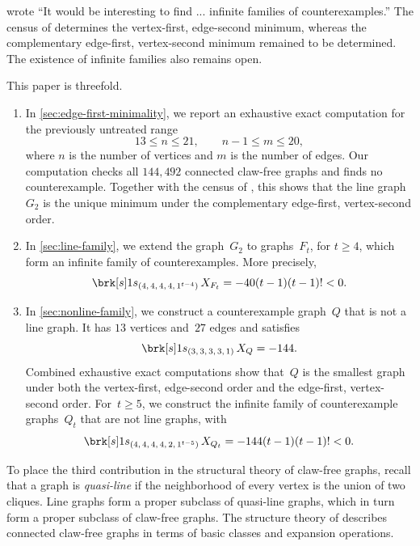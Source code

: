 \documentclass[11pt]{amsart}
\numberwithin{equation}{section}
\theoremstyle{remark}
\newcommand{\CSF}{X}
\newcommand{\Gtwo}{G_{2}}
\newcommand{\Ft}{F_t}
\newcommand{\Qt}{Q_t}
\newcommand{\coeff}[2]{\brk[s]1{s_{#1}}\,#2}
\begin{document}
 wrote
``It would be interesting to find ... infinite families of counterexamples.'' The census of \citet{Prajapati2026} determines the
vertex-first, edge-second minimum, whereas the complementary
edge-first, vertex-second minimum remained to be determined.  The
existence of infinite families also remains open.  

This paper is threefold.
\begin{enumerate}[label=\textup{(\arabic*)},leftmargin=*,itemsep=3pt]
\item 
In \cref{sec:edge-first-minimality}, we report an exhaustive exact
computation for the previously untreated range
\[
13\le n\le21,\qquad n-1\le m\le20, 
\]
where $n$ is the number of vertices and $m$ is the number of edges.
Our computation checks all $144{,}492$ connected claw-free graphs
and finds no counterexample.  Together with the census of
\citet{Prajapati2026}, this shows that the line graph~$\Gtwo$ is the
unique minimum under the complementary edge-first, vertex-second order.
\item In \cref{sec:line-family}, we extend the graph~$\Gtwo$ to graphs~$\Ft$, for
$t\ge4$, which form an infinite family of counterexamples. More precisely,
\[
\coeff{(4,\,4,\,4,\,4,\,1^{t-4})}{\CSF_{\Ft}}
=-40(t-1)(t-1)!<0.
\]

\item In \cref{sec:nonline-family}, we construct a counterexample graph~$Q$ that is not a line graph. It has $13$ vertices and~$27$ edges and satisfies
\[
\coeff{(3,\,3,\,3,\,3,\,1)}{\CSF_Q}=-144.
\]
Combined exhaustive exact
computations show that~$Q$ is the smallest graph under both the vertex-first, edge-second order and the edge-first, vertex-second order.  For~$t\ge5$, we construct the infinite family of counterexample graphs~$\Qt$ that are not 
line graphs, with
\[
\coeff{(4,\,4,\,4,\,4,\,2,\,1^{t-5})}{\CSF_{\Qt}}
=-144(t-1)(t-1)!<0.
\]
\end{enumerate}

To place the third contribution in the structural theory of claw-free graphs, recall that a graph is \emph{quasi-line} if the neighborhood of every vertex is the union of two cliques.  Line graphs form a proper subclass of quasi-line graphs, which in turn form a proper subclass of claw-free graphs. The structure theory of \citet{ChudnovskySeymour2005} describes connected claw-free graphs in terms of basic classes and expansion operations.  
\end{document}
